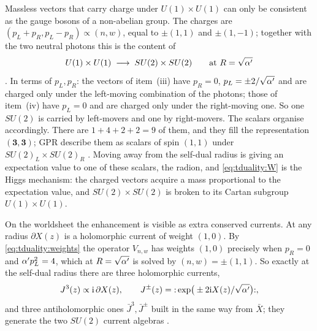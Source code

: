 Massless vectors that carry charge under $U(1)\times U(1)$ can only be consistent as the
gauge bosons of a non-abelian group. The charges are $(p_L+p_R,p_L-p_R)\propto(n,w)$, equal to
$\pm(1,1)$ and $\pm(1,-1)$; together with the two neutral photons this is the content of
\begin{equation}\label{eq:tduality:su2}
  U(1)\times U(1)\;\longrightarrow\;SU(2)\times SU(2)\qquad\text{at }R=\sqrt{\alpha'}
\end{equation}
. In terms of $p_L,p_R$: the
vectors of item~(iii) have $p_R=0$, $p_L=\pm2/\sqrt{\alpha'}$ and are charged only under the
left-moving combination of the photons; those of item~(iv) have $p_L=0$ and are charged only under
the right-moving one. So one $SU(2)$ is carried by left-movers and one by right-movers. The
scalars organise accordingly. There are $1+4+2+2=9$ of them, and they fill the representation
$(\mathbf3,\mathbf3)$; GPR describe them as scalars of spin $(1,1)$ under $SU(2)_L\times SU(2)_R$
. Moving away from the self-dual radius is giving an
expectation value to one of these scalars, the radion, and \eqref{eq:tduality:W} is the Higgs
mechanism: the charged vectors acquire a mass proportional to the expectation value, and
$SU(2)\times SU(2)$ is broken to its Cartan subgroup $U(1)\times U(1)$.

On the worldsheet the enhancement is visible as extra conserved currents. At any radius
$\partial X(z)$ is a holomorphic current of weight $(1,0)$. By \eqref{eq:tduality:weights} the
operator $V_{n,w}$ has weights $(1,0)$ precisely when $p_R=0$ and $\alpha' p_L^2=4$, which at
$R=\sqrt{\alpha'}$ is solved by $(n,w)=\pm(1,1)$. So exactly at the self-dual radius there are three
holomorphic currents,
\begin{equation}\label{eq:tduality:currents}
  J^3(z)\propto\mathrm{i}\,\partial X(z),\qquad J^\pm(z)={:}\exp\!\big(\pm2\mathrm{i} X(z)/\sqrt{\alpha'}\big){:},
\end{equation}
and three antiholomorphic ones $\bar J^3,\bar J^\pm$ built in the same way from $\bar X$; they
generate the two $SU(2)$ current algebras .


